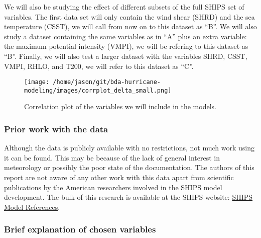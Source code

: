 \documentclass[
]{article}
\begin{document}
We will also be studying the effect of different subsets of the full
SHIPS set of variables. The first data set will only contain the wind
shear (SHRD) and the sea temperature (CSST), we will call from now on to
this dataset as ``B''. We will also study a dataset containing the same
variables as in ``A'' plus an extra variable: the maximum potential
intensity (VMPI), we will be refering to this dataset as ``B''. Finally,
we will also test a larger dataset with the variables SHRD, CSST, VMPI,
RHLO, and T200, we will refer to this dataset as ``C''.

\begin{figure}
\centering
\texttt{[image: /home/jason/git/bda-hurricane-modeling/images/corrplot\_delta\_small.png]}
\caption{Correlation plot of the variables we will include in the
models.}
\end{figure}

\hypertarget{prior-work-with-the-data}{%
\subsubsection{Prior work with the
data}\label{prior-work-with-the-data}}

Although the data is publicly available with no restrictions, not much
work using it can be found. This may be because of the lack of general
interest in meteorology or possibly the poor state of the documentation.
The authors of this report are not aware of any other work with this
data apart from scientific publications by the American researchers
involved in the SHIPS model development. The bulk of this research is
available at the SHIPS website:
\href{http://rammb.cira.colostate.edu/research/tropical_cyclones/ships/references.asp}{SHIPS
Model References}.

\hypertarget{brief-explanation-of-chosen-variables}{%
\subsubsection{Brief explanation of chosen
variables}\label{brief-explanation-of-chosen-variables}}
\end{document}
